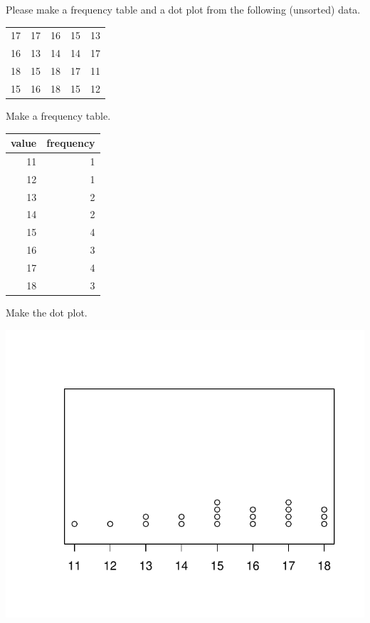 
\begin{question}
Please make a frequency table and a dot plot from the following
(unsorted) data.

\begin{longtable}[]{@{}rrrrr@{}}
\toprule
\endhead
17 & 17 & 16 & 15 & 13\tabularnewline
16 & 13 & 14 & 14 & 17\tabularnewline
18 & 15 & 18 & 17 & 11\tabularnewline
15 & 16 & 18 & 15 & 12\tabularnewline
\bottomrule
\end{longtable}
\end{question}

\begin{solution}
Make a frequency table.

\begin{longtable}[]{@{}rr@{}}
\toprule
value & frequency\tabularnewline
\midrule
\endhead
11 & 1\tabularnewline
12 & 1\tabularnewline
13 & 2\tabularnewline
14 & 2\tabularnewline
15 & 4\tabularnewline
16 & 3\tabularnewline
17 & 4\tabularnewline
18 & 3\tabularnewline
\bottomrule
\end{longtable}

Make the dot plot.

\includegraphics{hist-1.pdf}\\
\end{solution}

